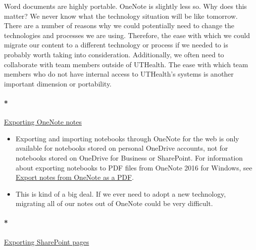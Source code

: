 \documentclass[
  letterpaper,
  DIV=11,
  numbers=noendperiod]{scrreprt}
\let\oldparagraph\paragraph
\renewcommand{\paragraph}[1]{\oldparagraph{#1}\mbox{}}
\providecommand{\tightlist}{%
  \setlength{\itemsep}{0pt}\setlength{\parskip}{0pt}}\usepackage{longtable,booktabs,array}
\begin{document}
Word documents are highly portable. OneNote is slightly less so. Why
does this matter? We never know what the technology situation will be
like tomorrow. There are a number of reasons why we could potentially
need to change the technologies and processes we are using. Therefore,
the ease with which we could migrate our content to a different
technology or process if we needed to is probably worth taking into
consideration. Additionally, we often need to collaborate with team
members outside of UTHealth. The ease with which team members who do not
have internal access to UTHealth's systems is another important
dimension or portability.

\paragraph*{\texorpdfstring{\href{https://support.microsoft.com/en-us/office/export-and-import-onenote-notebooks-a4b60da5-8f33-464e-b1ba-b95ce540f309}{Exporting
OneNote notes}}{Exporting OneNote notes}}\label{exporting-onenote-notes}

\begin{itemize}
\tightlist
\item
  Exporting and importing notebooks through OneNote for the web is only
  available for notebooks stored on personal OneDrive accounts, not for
  notebooks stored on OneDrive for Business or SharePoint. For
  information about exporting notebooks to PDF files from OneNote 2016
  for Windows, see
  \href{https://support.microsoft.com/en-us/office/export-notes-from-onenote-as-a-pdf-13d173b5-7f4c-45a8-94eb-9354d63af5cd}{Export
  notes from OneNote as a PDF}.
\item
  This is kind of a big deal. If we ever need to adopt a new technology,
  migrating all of our notes out of OneNote could be very difficult.
\end{itemize}

\paragraph*{\texorpdfstring{\href{https://learn.microsoft.com/en-us/sharepoint/administration/export-a-site-list-or-document-library}{Exporting
SharePoint
pages}}{Exporting SharePoint pages}}\label{exporting-sharepoint-pages}
\end{document}
